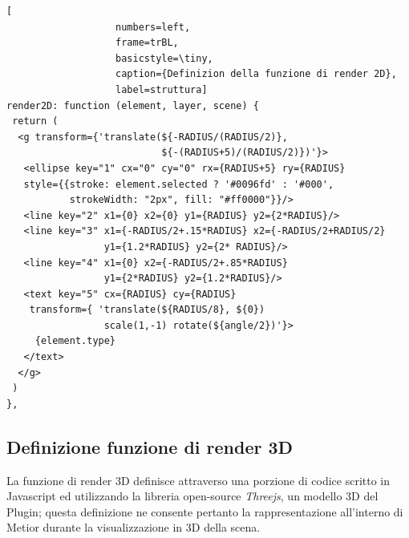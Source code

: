 \begin{lstlisting}[
                   numbers=left,
                   frame=trBL,
                   basicstyle=\tiny,
                   caption={Definizion della funzione di render 2D},
                   label=struttura]
render2D: function (element, layer, scene) {
 return (
  <g transform={'translate(${-RADIUS/(RADIUS/2)},
                           ${-(RADIUS+5)/(RADIUS/2)})'}>
   <ellipse key="1" cx="0" cy="0" rx={RADIUS+5} ry={RADIUS}
   style={{stroke: element.selected ? '#0096fd' : '#000',
           strokeWidth: "2px", fill: "#ff0000"}}/>
   <line key="2" x1={0} x2={0} y1={RADIUS} y2={2*RADIUS}/>
   <line key="3" x1={-RADIUS/2+.15*RADIUS} x2={-RADIUS/2+RADIUS/2}
                 y1={1.2*RADIUS} y2={2* RADIUS}/>
   <line key="4" x1={0} x2={-RADIUS/2+.85*RADIUS}
                 y1={2*RADIUS} y2={1.2*RADIUS}/>
   <text key="5" cx={RADIUS} cy={RADIUS}
    transform={ 'translate(${RADIUS/8}, ${0})
                 scale(1,-1) rotate(${angle/2})'}>
     {element.type}
   </text>
  </g>
 )
},
\end{lstlisting}
\newpage

\subsection{Definizione funzione di render 3D}
La funzione di render 3D definisce attraverso una porzione di codice scritto in Javascript ed utilizzando
la libreria open-source \emph{Threejs}, un modello 3D del Plugin;
questa definizione ne consente pertanto la rappresentazione all'interno di Metior durante la visualizzazione in 3D della scena.\\


